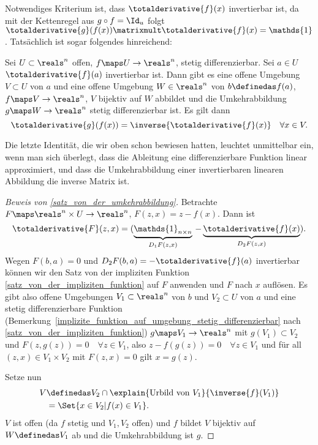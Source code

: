Notwendiges Kriterium ist, dass \( \totalderivative{f}(x) \) invertierbar ist, da mit der Kettenregel aus \( g\circ f=\Id_u \) folgt \( \totalderivative{g}(f(x))\matrixmult \totalderivative{f}(x)=\mathds{1} \). Tatsächlich ist sogar folgendes hinreichend:

\begin{satz}\label{satz_von_der_umkehrabbildung}
  Sei \( U\subset \reals^n \) offen, \( f\maps U\to \reals^n \), stetig differenzierbar. Sei \( a\in U \) \sd \( \totalderivative{f}(a) \) invertierbar ist. Dann gibt es eine offene Umgebung \( V\subset U \) von \( a \) und eine offene Umgebung \( W\in \reals^n \) von \( b\definedas f(a) \), \sd \( f\maps V\to \reals^n \), \( V \) bijektiv auf \( W \) abbildet und die Umkehrabbildung \( g\maps W\to \reals^n \) stetig differenzierbar ist. Es gilt dann
  \begin{equation*}
    \totalderivative{g}(f(x))=\inverse{\totalderivative{f}(x)}\quad \forall x\in V.
  \end{equation*}
\end{satz}
\begin{bemerkung*}
  Die letzte Identität, die wir oben schon bewiesen hatten, leuchtet unmittelbar ein, wenn man sich überlegt, dass die Ableitung eine differenzierbare Funktion linear approximiert, und dass die Umkehrabbildung einer invertierbaren linearen Abbildung die inverse Matrix ist.
\end{bemerkung*}
\begin{proof}[Beweis von \ref{satz_von_der_umkehrabbildung}]
  Betrachte \( F\maps \reals^n\times U\to \reals^n \), \( F(z,x)=z-f(x) \). Dann ist 
  \begin{equation*}
    \totalderivative{F}(z,x) = (\underbrace{\mathds{1}_{n\times n}}_{D_1 F(z,x)}\, -\underbrace{\totalderivative{f}(x)}_{D_2 F(z,x)}).
  \end{equation*} 
  Wegen \( F(b,a)=0 \) und \( D_2 F(b,a)=-\totalderivative{f}(a) \) invertierbar können wir den Satz von der impliziten Funktion \ref{satz_von_der_impliziten_funktion} auf \( F \) anwenden und \( F \) nach \( x \) auflösen. Es gibt also offene Umgebungen \( V_1\subset \reals^n \) von \( b \) und \( V_2\subset U \) von \( a \) und eine stetig differenzierbare Funktion (\vgl Bemerkung~\ref{implizite_funktion_auf_umgebung_stetig_differenzierbar} nach    \ref{satz_von_der_impliziten_funktion}) \( g\maps V_1\to \reals^n \) mit \( g(V_1)\subset V_2 \) und \( F(z,g(z))=0\quad \forall z\in V_1 \), also \( z-f(g(z))=0 \quad \forall z\in V_1 \) und für all \( (z,x)\in V_1\times V_2 \) mit \( F(z,x)=0 \) gilt \( x=g(z) \).

  Setze nun
  \begin{gather*}
    V \begin{aligned}[t]
      &\definedas V_2\cap \explain{\text{Urbild von \( V_1 \)}}{\inverse{f}(V_1)}\\
      &=\Set{x\in V_2|f(x)\in V_1}.
    \end{aligned}
  \end{gather*}
  \( V \) ist offen (da \( f \) stetig und \( V_1,V_2 \) offen) und \( f \) bildet \( V \) bijektiv auf \( W\definedas V_1 \) ab und die Umkehrabbildung ist \( g \).
\end{proof}

